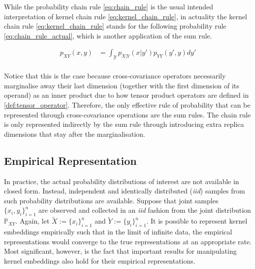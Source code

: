 \documentclass[twoside]{article} \usepackage{aistats2017}
\theoremstyle{definition}
\newtheorem{theorem}{Theorem}[section]
\newcommand{\rv}[1]{{#1}}
\newcommand{\ds}[1]{\tilde{#1}}
\begin{document}
		While the probability chain rule \eqref{eq:chain_rule} is the usual intended interpretation of kernel chain rule \eqref{eq:kernel_chain_rule}, in actuality the kernel chain rule \eqref{eq:kernel_chain_rule} stands for the following probability rule \eqref{eq:chain_rule_actual}, which is another application of the sum rule.

		\begin{equation}
		\begin{aligned}
			p_{\rv{X} \rv{Y}}(x, y) &= \int_{\mathcal{Y}} p_{\rv{X} | \rv{Y}}(x | y') p_{\rv{Y} \rv{Y}}(y', y) dy' \\
		\label{eq:chain_rule_actual}
		\end{aligned}
		\end{equation}	
					
		Notice that this is the case because cross-covariance operators necessarily marginalise away their last dimension (together with the first dimension of its operand) as an inner product due to how tensor product operators are defined in \cref{def:tensor_operator}. Therefore, the only effective rule of probability that can be represented through cross-covariance operations are the sum rules. The chain rule is only represented indirectly by the sum rule through introducing extra replica dimensions that stay after the marginalisation.

%			
	\subsection{Empirical Representation}
	\label{sec:kernel_embeddings:empirical_representation}
	
		In practice, the actual probability distributions of interest are not available in closed form. Instead, independent and identically distributed (\textit{iid}) samples from such probability distributions are available. Suppose that joint samples $\{x_{i}, y_{i}\}_{i = 1}^{n}$ are observed and collected in an \textit{iid} fashion from the joint distribution $\mathbb{P}_{\rv{X} \rv{Y}}$. Again, let $\ds{X} := \{x_{i}\}_{i = 1}^{n}$ and $\ds{Y} := \{y_{i}\}_{i = 1}^{n}$. It is possible to represent kernel embeddings empirically such that in the limit of infinite data, the empirical representations would converge to the true representations at an appropriate rate. Most significant, however, is the fact that important results for manipulating kernel embeddings also hold for their empirical representations.
\end{document}
